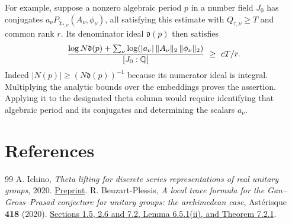 \documentclass[a4paper,11pt]{article}
\theoremstyle{definition}
\theoremstyle{remark}
\numberwithin{equation}{section}
\begin{document}
For example, suppose a nonzero algebraic period $p$ in a number
field $J_0$ has conjugates $a_\nu P_{\chi_{*,\nu}}(A_\nu,\phi_\nu)$,
all satisfying this estimate with $Q_{\tau,\nu}\ge T$ and common
rank $r$. Its denominator ideal $\mathfrak d(p)$ then satisfies
\[
 \frac{\log N\mathfrak d(p)+
      \sum_\nu\log(|a_\nu|\,\|A_\nu\|_2\,\|\phi_\nu\|_2)}
      {[J_0:\mathbb Q]}\ \ge\ cT/r .
\]
Indeed $|N(p)|\ge(N\mathfrak d(p))^{-1}$ because its numerator
ideal is integral. Multiplying the analytic bounds over the
embeddings proves the assertion. Applying it to the designated
theta column would require identifying that algebraic period and
its conjugates and determining the scalars $a_\nu$.

\clearpage
\section{References}\label{nav:bibliography-XX}
\begingroup{}\begin{thebibliography}{99}\small
{} A. Ichino, \emph{Theta lifting for discrete series representations of real unitary groups}, 2020. \href{https://arxiv.org/abs/2002.09148}{Preprint}.
 R. Beuzart-Plessis, \emph{A local trace formula for the Gan--Gross--Prasad conjecture for unitary groups: the archimedean case}, Ast\'erisque \textbf{418} (2020). \href{https://arxiv.org/pdf/1506.01452}{Sections 1.5, 2.6 and 7.2, Lemma 6.5.1(ii), and Theorem 7.2.1}.
\end{thebibliography}\endgroup
\end{document}
